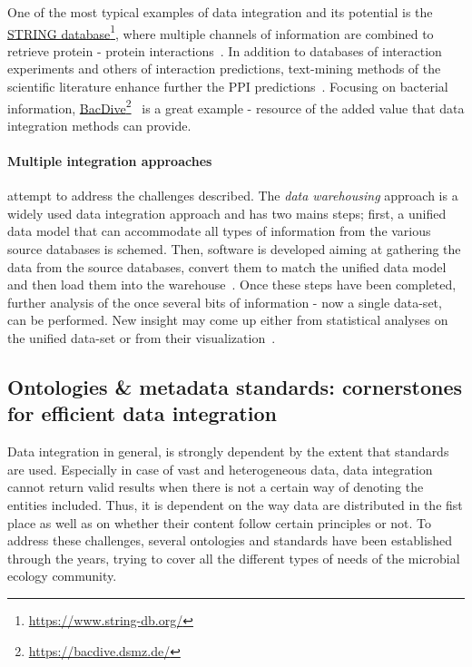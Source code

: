       One of the most typical examples of data integration and its potential
      is the \href{https://www.string-db.org/}{STRING database}\footnote{\href{https://www.string-db.org/}{https://www.string-db.org/}}, where multiple channels of information are combined 
      to retrieve protein - protein interactions~\citep{mering2003string, szklarczyk2021string}. 
      In addition to databases of interaction experiments and others of interaction predictions, text-mining methods of the scientific literature enhance further the 
      PPI predictions~\citep{szklarczyk2021string}.
      Focusing on bacterial information, \href{https://bacdive.dsmz.de/}{BacDive}\footnote{\href{https://bacdive.dsmz.de/}{https://bacdive.dsmz.de/}}~\citep{reimer2019bac}
      is a great example - resource of the added value that data integration methods can provide. 

      \paragraph{Multiple integration approaches} attempt to address the challenges described. 
      The \textit{data warehousing} approach is a widely used data integration approach and has two mains steps; 
      first, a unified data model that can accommodate all types of  
      information from the various source databases is schemed.
      Then, software is developed aiming at  
      gathering the data from the source databases, 
      convert them to match the unified data model and 
      then load them into the warehouse~\citep{stein2003integrating}.
      Once these steps have been completed, further analysis of the once
      several bits of information - now a single data-set, can be performed.
      New insight may come up either from statistical analyses on the unified
      data-set or from their visualization~\citep{leonelli2013integrating}.  

   \subsection{Ontologies \& metadata standards: cornerstones for efficient data integration}
   \label{subsec:metadata_intro}
      Data integration in general, 
      is strongly dependent by the extent that standards are used. 
      Especially in case of vast and heterogeneous data, 
      data integration cannot return valid results 
      when there is not a certain way
      of denoting the entities included.
      Thus, it is dependent on the way data are distributed in the fist place 
      as well as on whether their content follow certain principles or not. 
      To address these challenges, several ontologies and standards have 
      been established through the years, trying to cover all the different 
      types of needs of the microbial ecology community. 

